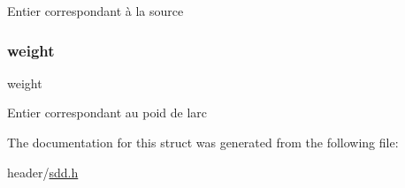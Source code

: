 Entier correspondant à la source \mbox{\label{structw__arc_a103012df4b715f58a539b009a0b8b340}} 
\subsubsection{\texorpdfstring{weight}{weight}}
{\footnotesize\ttfamily weight}

Entier correspondant au poid de l\textquotesingle{}arc 

The documentation for this struct was generated from the following file\+:\begin{DoxyCompactItemize}
\item 
header/\hyperlink{sdd_8h}{sdd.\+h}\end{DoxyCompactItemize}

